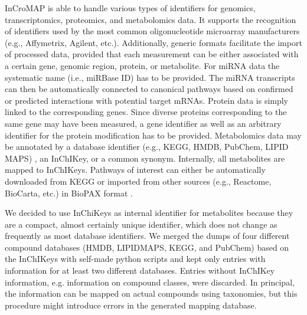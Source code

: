 \documentclass[final,5p,times,twocolumn]{elsarticle}
\newcommand\red[1]{{\color{red}#1}}
\begin{document}
InCroMAP is able to handle various types of identifiers for genomics, transcriptomics, proteomics, and metabolomics data. It supports the recognition of identifiers used by the most common oligonucleotide microarray manufacturers (e.g., Affymetrix, Agilent, etc.). Additionally, generic formats facilitate the import of processed data, provided that each measurement can be either associated with a certain gene, genomic region, protein, or metabolite. \red{For miRNA data the systematic name (i.e., miRBase ID) has to be provided. The miRNA transcripts can then be automatically connected to canonical pathways based on confirmed or predicted interactions with potential target mRNAs. Protein data is simply linked to the corresponding genes. Since diverse proteins corresponding to the same gene may have been measured, a gene identifier as well as an arbitrary identifier for the protein modification has to be provided.} Metabolomics data may be annotated by a database identifier (e.g., KEGG, HMDB, PubChem, LIPID MAPS)
, an InChIKey, or a common synonym. Internally, all metabolites are mapped to InChIKeys. Pathways of interest can either be automatically downloaded from KEGG or imported from other sources (e.g., Reactome, BioCarta, etc.) in BioPAX format \cite{Eustachio2011}.

\red{We decided to use InChiKeys as internal identifier for metabolites because they are a compact, almost certainly unique identifier, which does not change as frequently as most database identifiers. We merged the dumps of four different compound databases (HMDB, LIPIDMAPS, KEGG, and PubChem) based on the InChIKeys with self-made python scripts and kept only entries with information for at least two different databases. Entries without InChIKey information, e.g. information on compound classes,  were discarded. In principal, the information can be mapped on actual compounds using taxonomies, but this procedure might introduce errors in the generated mapping database.}
\end{document}
